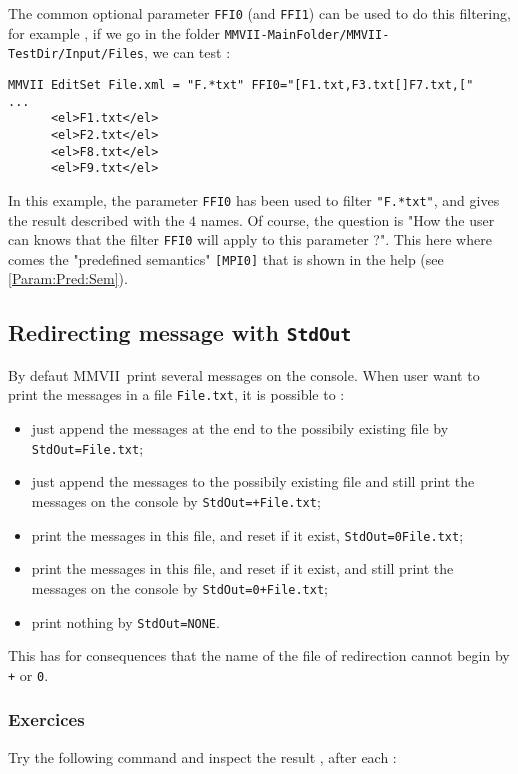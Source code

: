 \documentclass[a4paper]{book}
\newcommand{\PPP}{MMVII}
\newcommand{\MMVIDIR}{{\tt MMVII-MainFolder/}}
\newcommand{\MMNONE}{NONE}
\begin{document}
The common optional parameter {\tt FFI0} (and {\tt FFI1}) can be used to do this filtering,
for example , if we go in the folder  {\tt {\MMVIDIR}MMVII-TestDir/Input/Files}, we can test :

\begin{verbatim}
MMVII EditSet File.xml = "F.*txt" FFI0="[F1.txt,F3.txt[]F7.txt,["
...
      <el>F1.txt</el>
      <el>F2.txt</el>
      <el>F8.txt</el>
      <el>F9.txt</el>
\end{verbatim}

In this example, the parameter {\tt FFI0} has been used to filter {\tt "F.*txt"},
and gives the result described with the $4$ names. Of course, the question is "How the user can knows that the
filter  {\tt FFI0}  will apply to this parameter ?".  This here where comes the
"predefined semantics"  {\tt [MPI0]} that is shown in the help (see \ref{Param:Pred:Sem}).


\subsection{Redirecting message with {\tt StdOut}}

By defaut \PPP\, print several messages on the console. When user want  to
print the messages in a file {\tt File.txt}, it is possible to :

\begin{itemize}
  \item just append the messages at the end to the possibily existing file  by {\tt StdOut=File.txt};
  \item just append the messages to the possibily existing file  and still print the messages on the console
        by {\tt StdOut=+File.txt};
  \item print  the messages in this file, and reset if it exist, {\tt StdOut=0File.txt};
  \item print  the messages in this file, and reset if it exist, and still print the 
       messages on the console by {\tt StdOut=0+File.txt};
  \item print  nothing by {\tt StdOut=\MMNONE}.
\end{itemize}

This has for consequences that the name of the file of redirection 
cannot begin by {\tt +} or {\tt 0}.

\subsubsection{Exercices}
Try the following command and inspect the result , after each :
\end{document}
